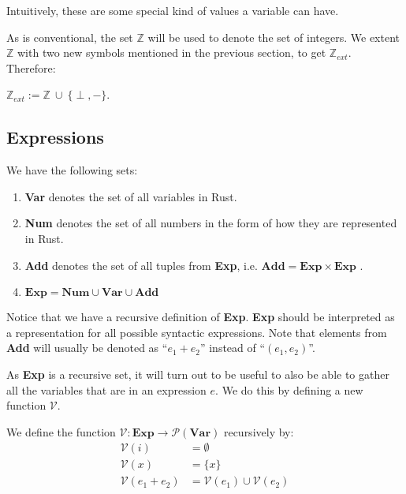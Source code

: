 Intuitively, these are some special kind of values a variable can have. 

As is conventional, the set $\mathbb{Z}$ will be used to denote the set of integers. We extent $\mathbb{Z}$ with two new symbols mentioned in the previous section, to get $\mathbb{Z}_{ext}$. Therefore: 

\begin{definition}
$\mathbb{Z}_{ext} := \mathbb{Z} ~\cup ~ \{\perp, -\}$.
\end{definition}

\subsection*{Expressions}
\begin{definition}
We have the following sets:
\begin{enumerate}[noitemsep, label={\roman*)}]
    \item \textbf{Var} denotes the set of all variables in Rust.
    \item \textbf{Num} denotes the set of all numbers in the form of how they are represented in Rust.
    \item \textbf{Add} denotes the set of all tuples from \textbf{Exp}, i.e. $\textbf{Add} = \textbf{Exp} \times \textbf{Exp}$ . 
    \item $\textbf{Exp} = \textbf{Num} \cup \textbf{Var} \cup \textbf{Add}$
\end{enumerate}
\end{definition}

Notice that we have a recursive definition of \textbf{Exp}. \textbf{Exp} should be interpreted as a representation for all possible syntactic expressions. Note that elements from \textbf{Add} will usually be denoted as ``$e_1 + e_2$'' instead of ``$(e_1, e_2)$''.

As \textbf{Exp} is a recursive set, it will turn out to be useful to also be able to gather all the variables that are in an expression $e$. We do this by defining a new function $\mathcal{V}$.

\begin{definition}
We define the function $\mathcal{V}: \textbf{Exp} \to \mathcal{P}(\textbf{Var})$ recursively by:
\begin{align*}
    \mathcal{V}(i)          &= \emptyset
\\  \mathcal{V}(x)          &= \{ x \}
\\  \mathcal{V}(e_1 + e_2)  &= \mathcal{V}(e_1) \cup \mathcal{V}(e_2)
\end{align*}
\end{definition}

